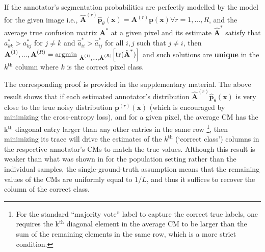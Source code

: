 \begin{theorem}\label{theorem:main}  
If the annotator's segmentation probabilities are perfectly modelled by the model for the given image i.e., $\hat{\textbf{A}}^{(r)}\hat{\textbf{p}}_\theta(\textbf{x})=\textbf{A}^{(r)}\textbf{p}(\textbf{x}) \forall r=1,...,R$, and the average true confusion matrix $\textbf{A}^{*}$ at a given pixel and its estimate $\hat{\textbf{A}}^{*}$ satisfy that $a^*_{kk} > a^*_{kj}$ for $j \neq k$ and $\hat{a}^*_{ii} > \hat{a}^*_{ij}$ for all $i, j$ such that $j \neq i$, then  $\textbf{A}^{(1)}, ..., \textbf{A}^{(R)} = \text{argmin }_{\hat{\textbf{A}}^{(1)}, ..., \hat{\textbf{A}}^{(R)}}\Big{[}\text{tr}(\hat{\textbf{A}}^{*})\Big{]}$ and such solutions are \textbf{unique} in the $k^{\text{th}}$ column where $k$ is the correct pixel class.



\end{theorem}
\vspace{2mm}
The corresponding proof is provided in the supplementary material. The above result shows that if each estimated annotator's distribution $\hat{\textbf{A}}^{(r)}\hat{\textbf{p}}_{\theta}(\mathbf{x})$ is very close to the true noisy distribution $\textbf{p}^{(r)}(\mathbf{x})$ (which is encouraged by minimizing the cross-entropy loss), and for a given pixel, the average CM has the k$^{\text{th}}$ diagonal entry larger than any other entries in the same row \footnote{For the standard ``majority vote'' label to capture the correct true labels, one requires the k$^{\text{th}}$ diagonal element in the average CM to be larger than the sum of the remaining elements in the same row, which is a more strict condition.}, then minimizing its trace will drive the estimates of the $k^{\text{th}}$ (`correct class') columns in the respective annotator's CMs to match the true values. Although this result is weaker than what was shown in \cite{tanno2019learning} for the population setting rather than the individual samples, the single-ground-truth assumption means that the remaining values of the CMs are uniformly equal to $1/L$, and thus it suffices to recover the column of the correct class.  

